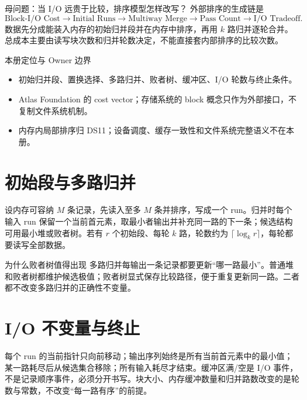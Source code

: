 \documentclass[UTF8,fontset=none,11pt,a4paper]{ctexart}
\begin{document}

\begin{corebox}{母问题：当 I/O 远贵于比较，排序模型怎样改写？}
外部排序的生成链是
\[
\text{Block-I/O Cost}\to\text{Initial Runs}\to\text{Multiway Merge}\to\text{Pass Count}\to\text{I/O Tradeoff}.
\]
数据先分成能装入内存的初始归并段并在内存中排序，再用 $k$ 路归并逐轮合并。总成本主要由读写块次数和归并轮数决定，不能直接套内部排序的比较次数。
\end{corebox}
\begin{methodbox}{本册定位与 Owner 边界}
\begin{itemize}
\item {}初始归并段、置换选择、多路归并、败者树、缓冲区、I/O 轮数与终止条件。
\item {}Atlas Foundation 的 cost vector；存储系统的 block 概念只作为外部接口，不复制文件系统机制。
\item {}内存内局部排序归 DS11；设备调度、缓存一致性和文件系统完整语义不在本册。
\end{itemize}
\end{methodbox}
\tableofcontents\newpage

\section{初始段与多路归并}
设内存可容纳 $M$ 条记录，先读入至多 $M$ 条并排序，写成一个 run。归并时每个输入 run 保留一个当前首元素，取最小者输出并补充同一路的下一条；候选结构可用最小堆或败者树。若有 $r$ 个初始段、每轮 $k$ 路，轮数约为 $\lceil\log_k r\rceil$，每轮都要读写全部数据。
\begin{examplebox}{为什么败者树值得出现}
多路归并每输出一条记录都要更新“哪一路最小”。普通堆和败者树都维护候选极值；败者树显式保存比较路径，便于重复更新同一路。二者都不改变多路归并的正确性不变量。
\end{examplebox}

\section{I/O 不变量与终止}
每个 run 的当前指针只向前移动；输出序列始终是所有当前首元素中的最小值；某一路耗尽后从候选集合移除；所有输入耗尽才结束。缓冲区满/空是 I/O 事件，不是记录顺序事件，必须分开书写。块大小、内存缓冲数量和归并路数改变的是轮数与常数，不改变“每一路有序”的前提。
\end{document}
